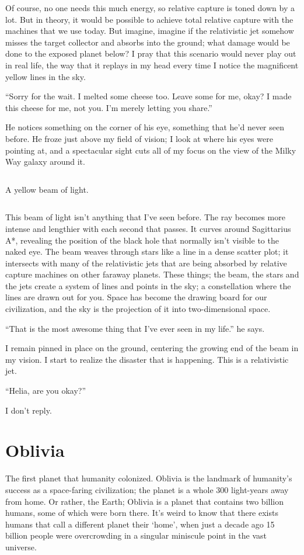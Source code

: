 \documentclass{book}
\newcommand{\spacer}{\[\]}
\begin{document}
			Of course, no one needs this much energy, so relative capture is toned down by a lot.
			But in theory, it would be possible to achieve total relative capture with the machines
			that we use today. But imagine, imagine if the relativistic jet somehow misses the
			target collector and absorbs into the ground; what damage would be done to the exposed
			planet below? I pray that this scenario would never play out in real life, the way that
			it replays in my head every time I notice the magnificent yellow lines in the sky.

			``Sorry for the wait. I melted some cheese too. Leave some for me, okay? I made this
			cheese for me, not you. I'm merely letting you share.''

			He notices something on the corner of his eye, something that he'd never seen before.
			He froze just above my field of vision; I look at where his eyes were pointing at, and
			a spectacular sight cuts all of my focus on the view of the Milky Way galaxy around it.

			\spacer{}

			A yellow beam of light.

			\spacer{}

			This beam of light isn't anything that I've seen before. The ray becomes more intense
			and lengthier with each second that passes. It curves around Sagittarius A*,
			revealing the position of the black hole that normally isn't visible to the naked eye.
			The beam weaves through stars like a line in a dense scatter plot; it intersects with
			many of the relativistic jets that are being absorbed by relative capture machines on
			other faraway planets. These things; the beam, the stars and the jets create a system
			of lines and points in the sky; a constellation where the lines are drawn out for you.
			Space has become the drawing board for our civilization, and the sky is the projection
			of it into two-dimensional space.

			``That is the most awesome thing that I've ever seen in my life.'' he says.

			I remain pinned in place on the ground, centering the growing end of the beam in my
			vision. I start to realize the disaster that is happening. This is a relativistic jet.

			``Helia, are you okay?''

			I don't reply.



		\chapter{Oblivia}
			The first planet that humanity colonized. Oblivia is the landmark of humanity's success
			as a space-faring civilization; the planet is a whole 300 light-years away from home. Or
			rather, the Earth; Oblivia is a planet that contains two billion humans, some of which
			were born there. It's weird to know that there exists humans that call a different planet
			their `home', when just a decade ago 15 billion people were overcrowding in a singular
			miniscule point in the vast universe.
\end{document}

